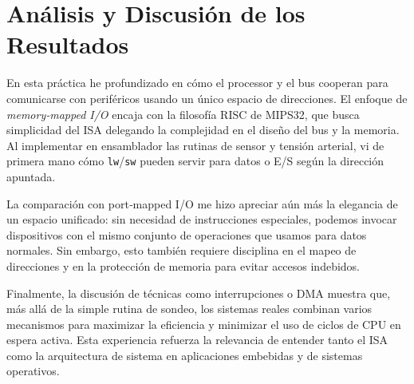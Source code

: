 \documentclass{article}
\begin{document}
\section{Análisis y Discusión de los Resultados}

En esta práctica he profundizado en cómo el processor y el bus cooperan para comunicarse con periféricos usando un único espacio de direcciones. El enfoque de \emph{memory‑mapped I/O} encaja con la filosofía RISC de MIPS32, que busca simplicidad del ISA delegando la complejidad en el diseño del bus y la memoria. Al implementar en ensamblador las rutinas de sensor y tensión arterial, vi de primera mano cómo \texttt{lw}/\texttt{sw} pueden servir para datos o E/S según la dirección apuntada.

La comparación con port‑mapped I/O me hizo apreciar aún más la elegancia de un espacio unificado: sin necesidad de instrucciones especiales, podemos invocar dispositivos con el mismo conjunto de operaciones que usamos para datos normales. Sin embargo, esto también requiere disciplina en el mapeo de direcciones y en la protección de memoria para evitar accesos indebidos.

Finalmente, la discusión de técnicas como interrupciones o DMA muestra que, más allá de la simple rutina de sondeo, los sistemas reales combinan varios mecanismos para maximizar la eficiencia y minimizar el uso de ciclos de CPU en espera activa. Esta experiencia refuerza la relevancia de entender tanto el ISA como la arquitectura de sistema en aplicaciones embebidas y de sistemas operativos.

\endgroup
\end{document}
